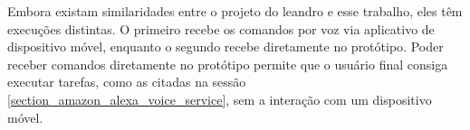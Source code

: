 Embora existam similaridades entre o projeto do leandro e esse trabalho, eles têm execuções distintas. O primeiro recebe os comandos por voz via aplicativo de dispositivo móvel, enquanto o segundo recebe diretamente no protótipo. Poder receber comandos diretamente no protótipo permite que o usuário final consiga executar tarefas, como as citadas na sessão \autoref{section_amazon_alexa_voice_service}, sem a interação com um dispositivo móvel.
